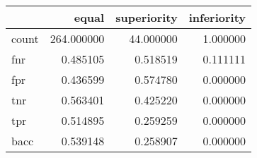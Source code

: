 \begin{tabular}{lrrr}
\toprule
{} &       equal &  superiority &  inferiority \\
\midrule
count &  264.000000 &    44.000000 &     1.000000 \\
fnr   &    0.485105 &     0.518519 &     0.111111 \\
fpr   &    0.436599 &     0.574780 &     0.000000 \\
tnr   &    0.563401 &     0.425220 &     0.000000 \\
tpr   &    0.514895 &     0.259259 &     0.000000 \\
bacc  &    0.539148 &     0.258907 &     0.000000 \\
\bottomrule
\end{tabular}

